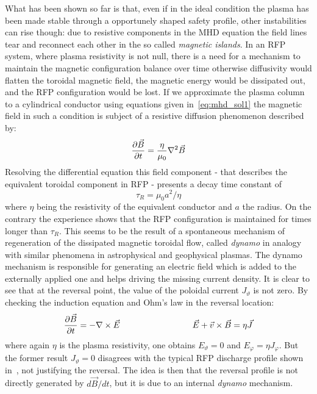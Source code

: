 What has been shown so far is that, even if in the ideal condition the plasma has been made stable through a opportunely shaped safety profile, other instabilities can rise though: due to resistive components in the MHD equation the field lines tear and reconnect each other in the so called \textit{magnetic islands}.
In an RFP system, where plasma resistivity is not null, there is a need for a mechanism to maintain the magnetic configuration balance over time otherwise diffusivity would flatten the toroidal magnetic field, the magnetic energy would be dissipated out, and the RFP configuration would be lost.
If we approximate the plasma column to a cylindrical conductor using equations given in~\eqref{eq:mhd_sol1} the magnetic field in such a condition is subject of a resistive diffusion phenomenon described by:
\begin{equation}
    \pdv{\Vec{B}}{t} = \frac{\eta}{\mu_0} \nabla^2 \Vec{B}
\end{equation}
Resolving the differential equation this field component - that describes the equivalent toroidal component in RFP - presents a decay time constant of $$\tau_R = \mu_0 a^2 / \eta$$ where $\eta$ being the resistivity of the equivalent conductor and $a$ the radius.
On the contrary the experience shows that the RFP configuration is maintained for times longer than $\tau_R$. This seems to be the result of a spontaneous mechanism of regeneration of the dissipated magnetic toroidal flow, called \textit{dynamo} in analogy with similar phenomena in astrophysical and geophysical plasmas. The dynamo mechanism is responsible for generating an electric field which is added to the externally applied one and helps driving the missing current density. 
It is clear to see that at the reversal point, the value of the poloidal current $J_\vartheta$ is not zero. By checking the induction equation and Ohm’s law in the reversal location:
\begin{equation*}
    \pdv{\Vec{B}}{t} = - \nabla \times \Vec{E}  \hspace{3cm} \Vec{E} + \Vec{v} \times \Vec{B} = \eta \Vec{J}
    \label{eq:ohm_dynamo}
\end{equation*}
where again $\eta$ is the plasma resistivity, one obtains $E_\vartheta = 0$ and $E_\varphi = \eta J_\varphi$. But the former
result $J_\vartheta = 0$ disagrees with the typical RFP discharge profile shown in~\Figure{\ref{fig:intro_safety_factor_profiles}}, not justifying the reversal.
The idea is then that the reversal profile is not directly generated by $d\Vec{B}/dt$, but it is due to an internal \textit{dynamo} mechanism.


